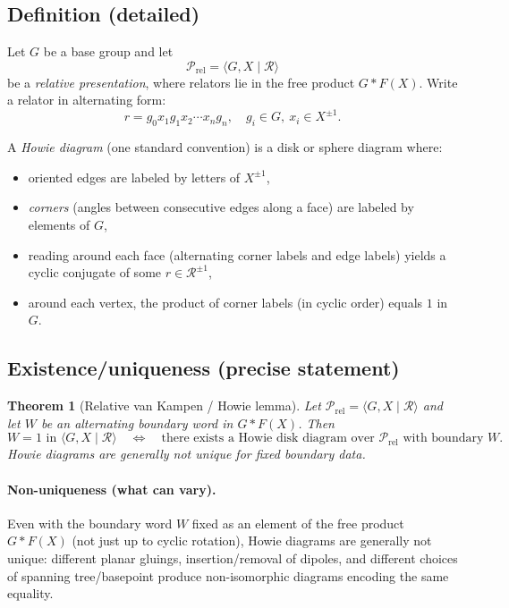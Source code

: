 \documentclass[11pt]{article}
\newtheorem{theorem}{Theorem}[section]
\theoremstyle{definition}
\theoremstyle{plain}
\theoremstyle{remark}
\begin{document}
\subsection*{Definition (detailed)}
Let $G$ be a base group and let
\[
\mathcal P_{\mathrm{rel}}=\langle G, X \mid \mathcal R\rangle
\]
be a \emph{relative presentation}, where relators lie in the free product $G*F(X)$.
Write a relator in alternating form:
\[
r=g_0 x_1 g_1 x_2 \cdots x_n g_n,\quad g_i\in G,\ x_i\in X^{\pm1}.
\]

A \emph{Howie diagram} (one standard convention) is a disk or sphere diagram where:
\begin{itemize}[leftmargin=2em]
\item oriented edges are labeled by letters of $X^{\pm1}$,
\item \emph{corners} (angles between consecutive edges along a face) are labeled by elements of $G$,
\item reading around each face (alternating corner labels and edge labels) yields a cyclic conjugate of some $r\in\mathcal R^{\pm1}$,
\item around each vertex, the product of corner labels (in cyclic order) equals $1$ in $G$.
\end{itemize}

\subsection*{Existence/uniqueness (precise statement)}
\begin{theorem}[Relative van Kampen / Howie lemma]\label{thm:howie}
Let $\mathcal P_{\mathrm{rel}}=\langle G,X\mid \mathcal R\rangle$ and let $W$ be an alternating boundary word in $G*F(X)$.
Then
\[
W=1 \text{ in } \langle G,X\mid \mathcal R\rangle
\quad\Longleftrightarrow\quad
\text{there exists a Howie disk diagram over }\mathcal P_{\mathrm{rel}}\text{ with boundary }W.
\]
Howie diagrams are generally not unique for fixed boundary data.
\end{theorem}


\paragraph{Non-uniqueness (what can vary).}
Even with the boundary word $W$ fixed as an element of the free product $G*F(X)$ (not just up to cyclic rotation),
Howie diagrams are generally not unique: different planar gluings, insertion/removal of dipoles, and different choices of spanning tree/basepoint
produce non-isomorphic diagrams encoding the same equality.
\end{document}
